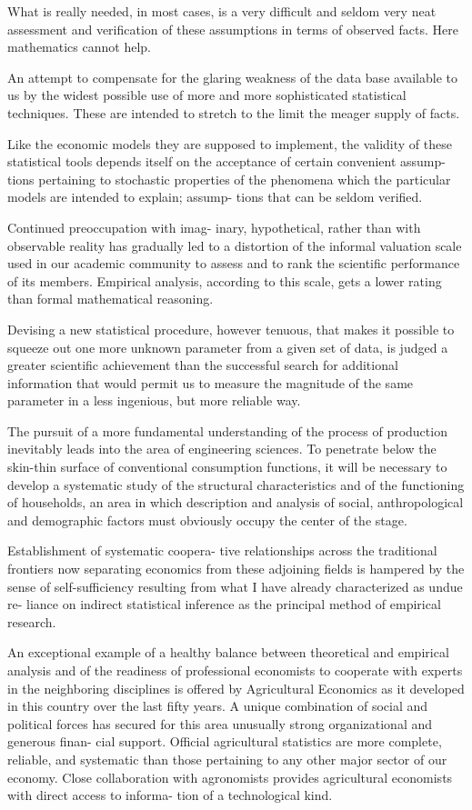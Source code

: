 \documentclass[
]{book}
\begin{document}
What is really needed, in most cases, is
a very difficult and seldom very neat
assessment and verification of these
assumptions in terms of observed facts. Here
mathematics cannot help.

An attempt to
compensate for the glaring weakness of
the data base available to us by the widest
possible use of more and more sophisticated
statistical techniques.
These are intended to stretch to the limit the
meager supply of facts.

Like the economic models they are
supposed to implement, the validity of
these statistical tools depends itself on the
acceptance of certain convenient assump-
tions pertaining to stochastic properties of
the phenomena which the particular
models are intended to explain; assump-
tions that can be seldom verified.

Continued preoccupation with imag-
inary, hypothetical, rather than with
observable reality has gradually led to a
distortion of the informal valuation scale
used in our academic community to assess
and to rank the scientific performance of its
members. Empirical analysis, according to
this scale, gets a lower rating than formal
mathematical reasoning.

Devising a new
statistical procedure, however tenuous,
that makes it possible to squeeze out one
more unknown parameter from a given
set of data, is judged a greater scientific
achievement than the successful search
for additional information that would
permit us to measure the magnitude of the
same parameter in a less ingenious, but
more reliable way.

The pursuit
of a more fundamental understanding of
the process of production inevitably leads
into the area of engineering sciences. To
penetrate below the skin-thin surface of
conventional consumption functions, it
will be necessary to develop a systematic
study of the structural characteristics and
of the functioning of households, an area in
which description and analysis of social,
anthropological and demographic factors
must obviously occupy the center of the
stage.

Establishment of systematic coopera-
tive relationships across the traditional
frontiers now separating economics from
these adjoining fields is hampered by the
sense of self-sufficiency resulting from what
I have already characterized as undue re-
liance on indirect statistical inference as
the principal method of empirical research.

An exceptional example of a healthy
balance between theoretical and empirical
analysis and of the readiness of professional
economists to cooperate with experts in
the neighboring disciplines is offered by
Agricultural Economics as it developed in
this country over the last fifty years. A
unique combination of social and political
forces has secured for this area unusually
strong organizational and generous finan-
cial support. Official agricultural statistics
are more complete, reliable, and systematic
than those pertaining to any other major
sector of our economy. Close collaboration
with agronomists provides agricultural
economists with direct access to informa-
tion of a technological kind.
\end{document}
